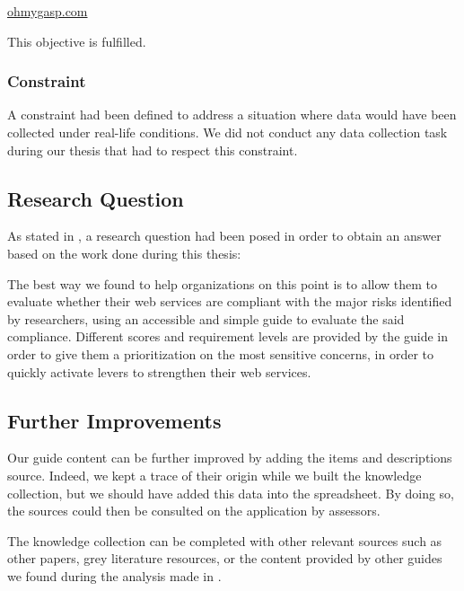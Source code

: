 \begin{center}
	\href{https://ohmygasp.com}{ohmygasp.com}
\end{center}

This objective is fulfilled.

\subsubsection{Constraint}

A constraint had been defined to address a situation where data would have been collected under real-life conditions. We did not conduct any data collection task during our thesis that had to respect this constraint.

\subsection{Research Question}
\label{subsec:conclusions_state_question}

As stated in , a research question had been posed in order to obtain an answer based on the work done during this thesis:

\begin{displayquote}
    \Researchquestion
\end{displayquote}

The best way we found to help organizations on this point is to allow them to evaluate whether their web services are compliant with the major risks identified by researchers, using an accessible and simple guide to evaluate the said compliance. Different scores and requirement levels are provided by the guide in order to give them a prioritization on the most sensitive concerns, in order to quickly activate levers to strengthen their web services.

\subsection{Further Improvements}
\label{subsec:conclusions_state_improvements}

Our guide content can be further improved by adding the items and descriptions source. Indeed, we kept a trace of their origin while we built the knowledge collection, but we should have added this data into the spreadsheet. By doing so, the sources could then be consulted on the application by assessors.

The knowledge collection can be completed with other relevant sources such as other papers, grey literature resources, or the content provided by other guides we found during the analysis made in .

